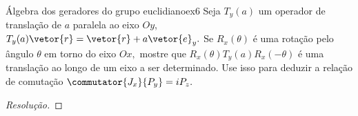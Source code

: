 \begin{exercício}{Álgebra dos geradores do grupo euclidiano}{ex6}
   Seja \(T_y(a)\) um operador de translação de \(a\) paralela ao eixo \(Oy\), \(T_y(a) \vetor{r} = \vetor{r} + a \vetor{e}_y.\) Se \(R_x(\theta)\) é uma rotação pelo ângulo \(\theta\) em torno do eixo \(Ox,\) mostre que \(R_x(\theta) T_y(a) R_x(-\theta)\) é uma translação ao longo de um eixo a ser determinado. Use isso para deduzir a relação de comutação \(\commutator{J_x}{P_y} = i P_z.\)
\end{exercício}
\begin{proof}[Resolução]

\end{proof}

